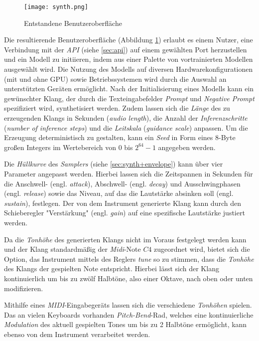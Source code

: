 \documentclass[
  a4paper,  %
  twoside,  %
  bibliography=totoc,
  headsepline,
  cleardoublepage=empty,
  parskip=half,
  draft=false
]{scrbook}
\begin{document}
\begin{figure}[h]
  \centering
  \texttt{[image: synth.png]}
  \caption[Benutzeroberfläche]{Entstandene Benutzeroberfläche}
  \label{fig:synth}
\end{figure} 

Die resultierende Benutzeroberfläche (Abbildung \ref{fig:synth}) erlaubt es einem Nutzer, eine Verbindung mit der \emph{API} (siehe \ref{sec:api}) auf einem gewählten Port herzustellen und ein Modell zu initiieren, indem aus einer Palette von vortrainierten Modellen ausgewählt wird. Die Nutzung des Modells auf diversen Hardwarekonfigurationen (mit und ohne GPU) sowie Betriebssystemen wird durch die Auswahl an unterstützten Geräten ermöglicht. Nach der Initialisierung eines Modells kann ein gewünschter Klang, der durch die Texteingabefelder \emph{Prompt} und \emph{Negative Prompt} spezifiziert wird, synthetisiert werden. Zudem lassen sich die \emph{Länge} des zu erzeugenden Klangs in Sekunden (\emph{audio length}), die Anzahl der \emph{Inferenzschritte} (\emph{number of inference steps}) und die \emph{Leitskala} (\emph{guidance scale}) anpassen. Um die Erzeugung deterministisch zu gestalten, kann ein \emph{Seed} in Form eines 8-Byte großen Integers im Wertebereich von $0$ bis $2^{64}-1$ angegeben werden.

Die \emph{Hüllkurve} des \emph{Samplers} (siehe \ref{sec:synth+envelope}) kann über vier Parameter angepasst werden. Hierbei lassen sich die Zeitspannen in Sekunden für die Anschwell- (engl. \emph{attack}), Abschwell- (engl. \emph{decay}) und Ausschwingphasen (engl. \emph{release}) sowie das Niveau, auf das die Lautstärke absinken soll (engl. \emph{sustain}), festlegen. Der von dem Instrument generierte Klang kann durch den Schieberegler "Verstärkung" (engl. \emph{gain}) auf eine spezifische Lautstärke justiert werden.

Da die \emph{Tonhöhe} des generierten Klangs nicht im Voraus festgelegt werden kann und der Klang standardmäßig der \emph{Midi}-Note $C4$ zugeordnet wird, bietet sich die Option, das Instrument mittels des Reglers \emph{tune} so zu stimmen, dass die \emph{Tonhöhe} des Klangs der gespielten Note entspricht. Hierbei lässt sich der Klang kontinuierlich um bis zu zwölf Halbtöne, also einer Oktave, nach oben oder unten modifizieren.

Mithilfe eines \emph{MIDI}-Eingabegeräts lassen sich die verschiedene \emph{Tonhöhen} spielen. Das an vielen Keyboards vorhanden \emph{Pitch-Bend}-Rad, welches eine kontinuierliche \emph{Modulation} des aktuell gespielten Tones um bis zu 2 Halbtöne ermöglicht, kann ebenso von dem Instrument verarbeitet werden. 
\end{document}
